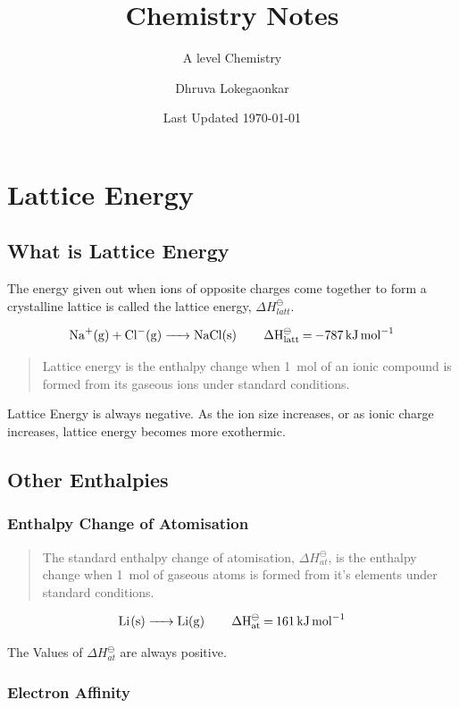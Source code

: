 \documentclass{scrbook}
\title{Chemistry Notes}
\subtitle{A level Chemistry}
\date{Last Updated \today{}}
\author{Dhruva Lokegaonkar}
\begin{document}
\maketitle
\tableofcontents

\chapter{Lattice Energy}

\section{What is Lattice Energy}

	The energy given out when ions of opposite charges come together to form a crystalline lattice is called the lattice energy, $\Delta H_{latt}^\ominus$.

	\[ \ce{Na+(g) + Cl-(g) ->  NaCl(s) \qquad \Delta H^\ominus_{latt} = \SI{-787}{ \kilo\joule\per\mole } }\]

	\begin{quote}
		Lattice energy is the enthalpy change when \SI{1}{\mole} of an ionic compound is formed from its gaseous ions under standard conditions.
	\end{quote}

	Lattice Energy is always negative. As the ion size increases, or as ionic charge increases, lattice energy becomes more exothermic.

\section{Other Enthalpies}

\subsection{Enthalpy Change of Atomisation}

	\begin{quote}
		The standard enthalpy change of atomisation, $\Delta H_{at}^\ominus$, is the enthalpy change when \SI{1}{\mole} of gaseous atoms is formed from it's elements under standard conditions.
	\end{quote}

	\[ \ce{ Li(s) -> Li(g) \qquad \Delta H^\ominus_{at} = \SI{161}{\kilo\joule\per\mole} } \]

	The Values of $\Delta H^\ominus_{at}$ are always positive.

\subsection{Electron Affinity}
\end{document}
